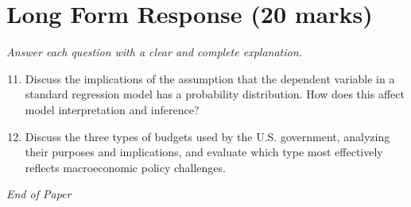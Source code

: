 \documentclass[12pt]{article}
\begin{document}
\section*{Long Form Response (20 marks)}
\textit{Answer each question with a clear and complete explanation.}
\begin{enumerate}[label=\arabic*.]
\setcounter{enumi}{10}
\item Discuss the implications of the assumption that the dependent variable in a standard regression model has a probability distribution. How does this affect model interpretation and inference?
\item Discuss the three types of budgets used by the U.S. government, analyzing their purposes and implications, and evaluate which type most effectively reflects macroeconomic policy challenges.
\end{enumerate}

\vfill
\noindent\textit{End of Paper}
\end{document}
